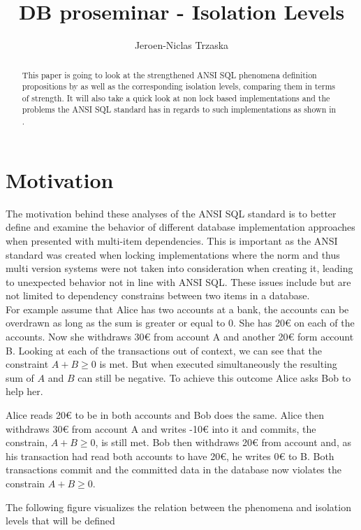 \documentclass[sigconf, review=false]{acmart}
\author{Jeroen-Niclas Trzaska}
\title{DB proseminar - Isolation Levels}
\affiliation{%
   \institution{TU Dresden}
   \city{Dresden}
   \state{Saxony}
   \country{Germany}}
\begin{document}
\begin{abstract}
    This paper is going to look at the strengthened ANSI SQL phenomena definition propositions
    by \cite{Adya_Liskov_O_Neil_2000} as well as the corresponding isolation levels,
    comparing them in terms of strength. It will also take a quick look at non lock based implementations
    and the problems the ANSI SQL standard has in regards to such implementations as shown in \cite{Berenson_Bernstein_Gray_Melton_O_Neil_O_Neil_1995}.
\end{abstract}
\maketitle

\section{Motivation}
The motivation behind these analyses of the ANSI SQL standard is to better define and examine the
behavior of different database implementation approaches when presented with multi-item dependencies.
This is important as the ANSI standard was created when locking implementations where the norm and thus multi version systems were not
taken into consideration when creating it, leading to unexpected behavior not in line with ANSI SQL.
These issues include but are not limited to dependency constrains between two items in a database. \\
For example assume that Alice has two accounts at a bank, the accounts can be overdrawn as long as the sum is greater or equal to 0.
She has 20€ on each of the accounts. Now she withdraws 30€ from account A and another 20€ form account B.
Looking at each of the transactions out of context, we can see that the constraint $A+B \geq 0$ is met.
But when executed simultaneously the resulting sum of $A$ and $B$ can still be negative. To achieve this outcome
Alice asks Bob to help her.
\begin{example}
    Alice reads 20€ to be in both accounts and Bob does the same. Alice then
    withdraws 30€ from account A and writes -10€ into it and commits, the constrain,
    $A+B \geq 0$, is still met.
    Bob then withdraws 20€ from account and, as his transaction had read both accounts to have
    20€, he writes 0€  to B. Both transactions commit and the committed data in the database now violates the constrain $A+B \geq 0$.
\end{example}
The following figure visualizes the relation between the phenomena and isolation levels that will be defined
\end{document}
